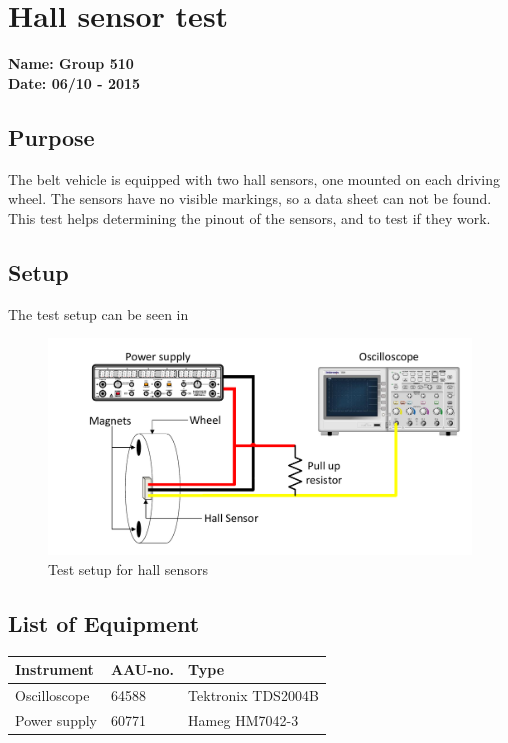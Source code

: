 \chapter{Hall sensor test} %
\textbf{Name: Group 510}\\
\textbf{Date: 06/10 - 2015}

\section*{Purpose}
The belt vehicle is equipped with two hall sensors, one mounted on each driving wheel. The sensors have no visible markings, so a data sheet can not be found. This test helps determining the pinout of the sensors, and to test if they work.
\\

\section*{Setup}
The test setup can be seen in 
\begin{figure}[H]
	\centering
	\includegraphics[scale=.6]{figures/hall-test-setup.pdf}
	\flushleft
	\caption{Test setup for hall sensors}
	\label{hallTest}
\end{figure}\vspace{-5mm}

\section*{List of Equipment}
\begin{table}[H]
\begin{tabular}{|l|l|p{4cm}|}
\hline%
  \textbf{Instrument}           &  \textbf{AAU-no.}  &  \textbf{Type}    \\
\hline%
  Oscilloscope                  &  64588             &  Tektronix TDS2004B  \\
\hline%
  Power supply							&  60771                  &   Hameg HM7042-3  \\
\hline%

\end{tabular}\\
\end{table}

